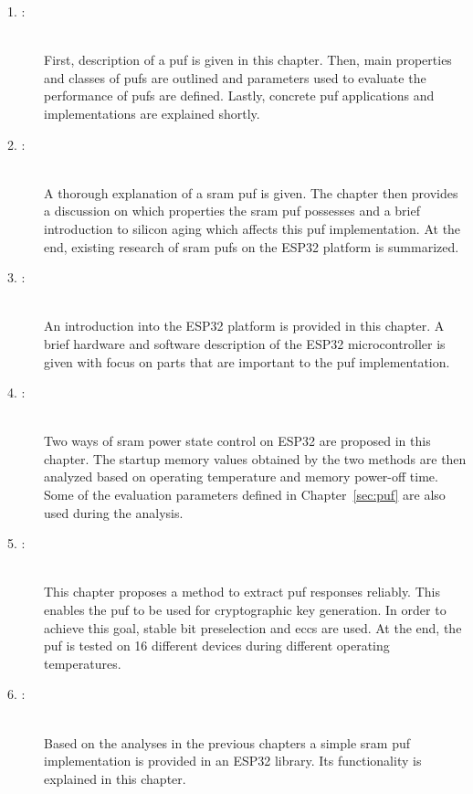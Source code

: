 \begin{description}
    \item[1. :] \hfill \\
        First, description of a \gls{puf} is given in this chapter. Then, main properties and classes of \glspl{puf} are outlined and parameters used to evaluate the performance of \glspl{puf} are defined. Lastly, concrete \gls{puf} applications and implementations are explained shortly.
    \item[2. :] \hfill \\
        A thorough explanation of a \gls{sram} \gls{puf} is given. The chapter then provides a discussion on which properties the \gls{sram} \gls{puf} possesses and a brief introduction to silicon aging which affects this \gls{puf} implementation. At the end, existing research of \gls{sram} \glspl{puf} on the ESP32 platform is summarized.
    \item[3. :] \hfill \\
        An introduction into the ESP32 platform is provided in this chapter. A brief hardware and software description of the ESP32 microcontroller is given with focus on parts that are important to the \gls{puf} implementation.
    \item[4. :] \hfill \\
        Two ways of \gls{sram} power state control on ESP32 are proposed in this chapter. The startup memory values obtained by the two methods are then analyzed based on operating temperature and memory power-off time. Some of the evaluation parameters defined in Chapter~\ref{sec:puf} are also used during the analysis.
    \item[5. :] \hfill \\
        This chapter proposes a method to extract \gls{puf} responses reliably. This enables the \gls{puf} to be used for cryptographic key generation. In order to achieve this goal, stable bit preselection and \glspl{ecc} are used. At the end, the \gls{puf} is tested on 16 different devices during different operating temperatures.
    \item[6. :] \hfill \\
        Based on the analyses in the previous chapters a simple \gls{sram} \gls{puf} implementation is provided in an ESP32 library. Its functionality is explained in this chapter.
\end{description}


